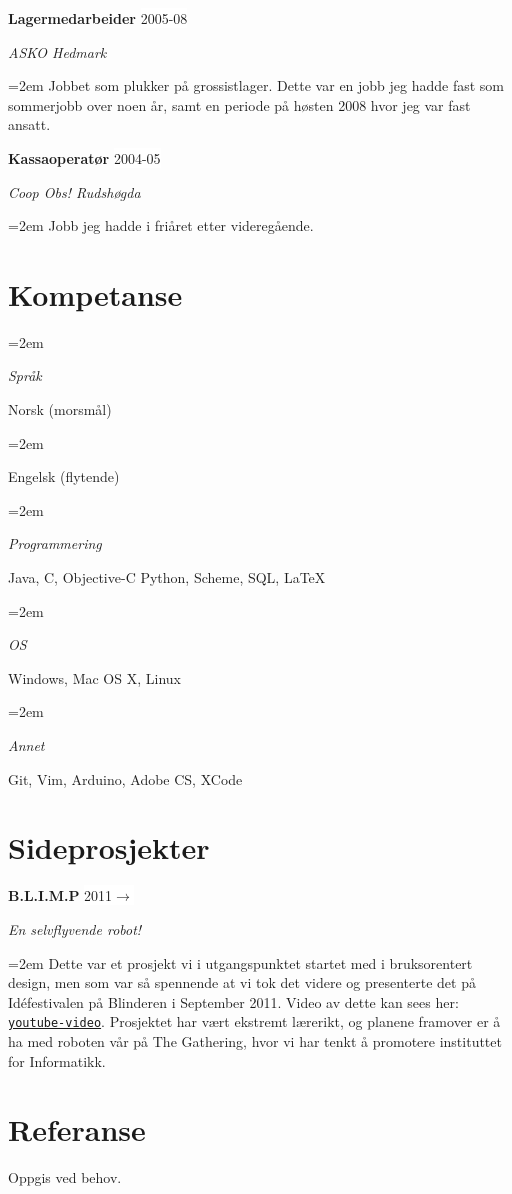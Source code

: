 \documentclass[paper=a4, fontsize=11pt]{scrartcl}
\newlength{\skillbox}
\newcommand{\sepspace}{\vspace*{1em}}
\newcommand{\SkillsEntry}[2]{						
		\noindent\hangindent=2em\hangafter=0 		%
		\parbox{\skillbox}{						%
		\textit{#1}}								%
		\hspace{1.5em} #2 \par}					%
\newcommand{\EducationEntry}[4]{ 
    \noindent \textbf{#1} \hfill 
    \colorbox{White}{%
        \parbox{6em}{%
        \hfill\color{Black}#2}} \par 
    \noindent \textit{#3} \par 
    \noindent\hangindent=2em\hangafter=0 \small #4 
    \normalsize \par}
\newcommand{\WorkEntry}[4]{						%
		\noindent \textbf{#1} \hfill 					%
		\colorbox{White}{\color{Black}#2} \par		%
		\noindent \textit{#3} \par					%
		\noindent\hangindent=2em\hangafter=0 \small #4 	%
		\normalsize \par}
\begin{document}
\WorkEntry
{Lagermedarbeider}
{2005-08}
{ASKO Hedmark}
{Jobbet som plukker på grossistlager. Dette var en jobb jeg hadde fast
som sommerjobb over noen år, samt en periode på høsten 2008 hvor jeg var
fast ansatt. }
\sepspace
\sepspace

\WorkEntry
{Kassaoperatør}
{2004-05}
{Coop Obs! Rudshøgda}
{Jobb jeg hadde i friåret etter videregående.}
\sepspace

\sepspace
\section*{Kompetanse}
\SkillsEntry{Språk}{Norsk (morsmål)}
\SkillsEntry{}{Engelsk (flytende)}
\sepspace
\SkillsEntry{Programmering}{Java, C, Objective-C Python, Scheme, SQL, \LaTeX}
\sepspace
\SkillsEntry{OS}{Windows, Mac OS X, Linux}
\sepspace
\SkillsEntry{Annet}{Git, Vim, Arduino, Adobe CS, XCode}

\sepspace
\sepspace
\section*{Sideprosjekter}
\WorkEntry
{B.L.I.M.P}
{2011$\rightarrow$}
{En selvflyvende robot!}
{Dette var et prosjekt vi i utgangspunktet startet med i bruksorentert
design, men som var så spennende at vi tok det videre og presenterte det
på Idéfestivalen på Blinderen i September 2011. Video av dette kan sees
her: \href{http://www.bit.ly/ifiblimp}{\tt{youtube-video}}. Prosjektet
har vært ekstremt lærerikt, og planene framover er å ha med roboten vår
på The Gathering, hvor vi har tenkt å promotere instituttet for
Informatikk.}

\sepspace
\sepspace
\section*{Referanse}
Oppgis ved behov.
\end{document}
